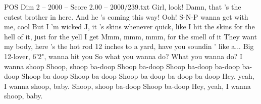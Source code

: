 \begin{textsample}{POS Dim 2 – 2000 – Score 2.00 – 2000/239.txt}
Girl, look!
Damn, that 's the cutest brother in here.
And he 's coming this way!
Ooh!
S-N-P wanna get with me, cool But I 'm wicked J, it 's skins whenever quick, like I hit the skins for the hell of it, just for the yell I get Mmm, mmm, mmm, for the smell of it They want my body, here 's the hot rod 12 inches to a yard, have you soundin ' like a...
Big 12-lover, 6'2", wanna hit you So what you wanna do?
What you wanna do?
I wanna shoop Shoop, shoop ba-doop Shoop ba-doop Shoop ba-doop ba-doop ba-doop Shoop ba-doop Shoop ba-doop Shoop ba-doop ba-doop ba-doop Hey, yeah, I wanna shoop, baby.
Shoop, shoop ba-doop Shoop ba-doop Hey, yeah, I wanna shoop, baby.

\end{textsample}

